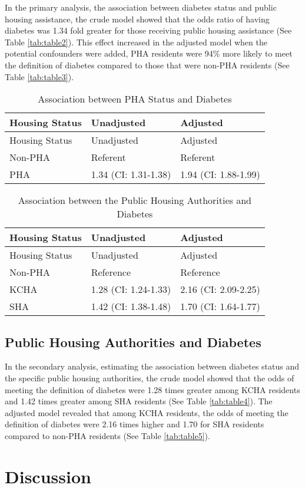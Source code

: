 \documentclass [11pt, proquest] {uwthesis}[2015/03/03]
\begin{document}
In the primary analysis, the association between diabetes status and
public housing assistance, the crude model showed that the odds ratio of
having diabetes was 1.34 fold greater for those receiving public housing
assistance (See Table \ref{tab:table2}). This effect increased in the
adjusted model when the potential confounders were added, PHA residents
were 94\% more likely to meet the definition of diabetes compared to
those that were non-PHA residents (See Table \ref{tab:table3}).
\begin{longtable}[]{@{}lll@{}}
\caption{\label{tab:PHA} Association between PHA Status and
Diabetes}\tabularnewline
\toprule
Housing Status & Unadjusted & Adjusted\tabularnewline
\midrule
\endfirsthead
\toprule
Housing Status & Unadjusted & Adjusted\tabularnewline
\midrule
\endhead
Non-PHA & Referent & Referent\tabularnewline
PHA & 1.34 (CI: 1.31-1.38) & 1.94 (CI: 1.88-1.99)\tabularnewline
\bottomrule
\end{longtable}
\begin{longtable}[]{@{}lll@{}}
\caption{\label{tab:PHAA} Association between the Public Housing Authorities
and Diabetes}\tabularnewline
\toprule
Housing Status & Unadjusted & Adjusted\tabularnewline
\midrule
\endfirsthead
\toprule
Housing Status & Unadjusted & Adjusted\tabularnewline
\midrule
\endhead
Non-PHA & Reference & Reference\tabularnewline
KCHA & 1.28 (CI: 1.24-1.33) & 2.16 (CI: 2.09-2.25)\tabularnewline
SHA & 1.42 (CI: 1.38-1.48) & 1.70 (CI: 1.64-1.77)\tabularnewline
\bottomrule
\end{longtable}
\section{Public Housing Authorities and
Diabetes}\label{public-housing-authorities-and-diabetes}

In the secondary analysis, estimating the association between diabetes
status and the specific public housing authorities, the crude model
showed that the odds of meeting the definition of diabetes were 1.28
times greater among KCHA residents and 1.42 times greater among SHA
residents (See Table \ref{tab:table4}). The adjusted model revealed that
among KCHA residents, the odds of meeting the definition of diabetes
were 2.16 times higher and 1.70 for SHA residents compared to non-PHA
residents (See Table \ref{tab:table5}).

\chapter{Discussion}\label{discussion}
\end{document}
